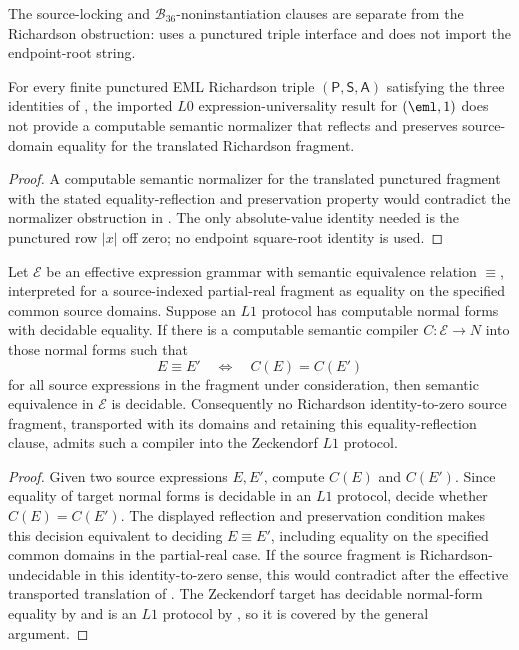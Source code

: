 \begin{remark}
The source-locking and \(\mathcal B_{36}\)-noninstantiation clauses are separate
from the Richardson obstruction:  uses
a punctured triple interface and does not import the endpoint-root string.
\end{remark}

\begin{corollary}
\label{cor:strict-L0-L1}
For every finite punctured EML Richardson triple
\((\mathsf P,\mathsf S,\mathsf A)\) satisfying the three identities of
, the imported \(L0\) expression-universality result for
\((\eml,1)\) does not provide a computable semantic normalizer that reflects
and preserves source-domain equality for the translated Richardson fragment.
\end{corollary}

\begin{proof}
A computable semantic normalizer for the translated punctured fragment with the
stated equality-reflection and preservation property would contradict the
normalizer obstruction in .  The only
absolute-value identity needed is the punctured row \(|x|\) off zero; no endpoint
square-root identity is used.
\end{proof}

\begin{proposition}
\label{prop:L1-compiles-L0}
Let \(\mathcal E\) be an effective expression grammar with semantic equivalence
relation \(\equiv\), interpreted for a source-indexed partial-real fragment as
equality on the specified common source domains.  Suppose an \(L1\) protocol has
computable normal forms with decidable equality.  If there is a computable
semantic compiler \(C\colon\mathcal E\to N\) into those normal forms such that
\[
  E\equiv E' \quad\Longleftrightarrow\quad C(E)=C(E')
\]
for all source expressions in the fragment under consideration, then semantic
equivalence in \(\mathcal E\) is decidable.  Consequently no Richardson
identity-to-zero source fragment, transported with its domains and retaining this
equality-reflection clause, admits such a compiler into the Zeckendorf \(L1\)
protocol.
\end{proposition}

\begin{proof}
Given two source expressions \(E,E'\), compute \(C(E)
\) and \(C(E')\).  Since equality of target normal forms is decidable in an
\(L1\) protocol, decide whether \(C(E)=C(E')\).  The displayed reflection and
preservation condition makes this decision equivalent to deciding
\(E\equiv E'\), including equality on the specified common domains in the
partial-real case.  If the source fragment is Richardson-undecidable in this
identity-to-zero sense, this would contradict 
after the effective transported translation of .  The Zeckendorf target has
decidable normal-form equality by  and is an \(L1\)
protocol by , so it is covered by the general
argument.
\end{proof}

